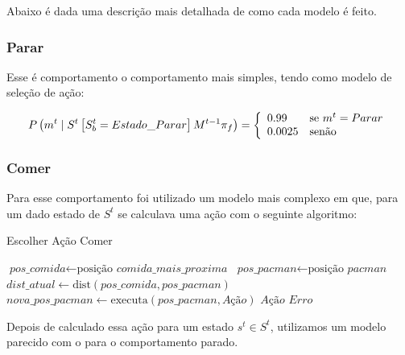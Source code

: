 Abaixo é dada uma descrição mais detalhada de como cada modelo é feito.

\subsubsection*{Parar}

Esse é comportamento o comportamento mais simples, tendo como modelo de seleção de ação:

\begin{equation}
    P \left( m^t \mid S^t \left[ S_b^t = Estado\_Parar \right] M^{t-1} \pi_f \right) = 
        \left\{
            \begin{array}{l l}
                0.99 & \text{se }m^t = Parar \\
                0.0025 & \text{senão}
            \end{array}
        \right.
\end{equation}

\subsubsection*{Comer}

Para esse comportamento foi utilizado um modelo mais complexo em que, para um dado estado de $ S^t $ se calculava uma ação com o seguinte algoritmo:

\begin{algorithm}[H]
	\caption{Escolher Ação Comer} \label{algorithm:SelecaoDeAcaoComer}
	\begin{algorithmic}[1]
			\State $\textit{pos\_comida} \gets \text{posição }\textit{comida\_mais\_proxima} $
			\State $\textit{pos\_pacman} \gets \text{posição }\textit{pacman} $
			\State $\textit{dist\_atual} \gets \text{dist} \left( \textit{pos\_comida}, \textit{pos\_pacman} \right) $
				\State $\textit{nova\_pos\_pacman} \gets \text{executa} \left( \textit{pos\_pacman}, \textit{Ação} \right) $
					\State \Return $ \textit{Ação} $
				\EndIf 
			\EndFor
			\State \Return $ \textit{Erro} $
		\EndProcedure
	\end{algorithmic}
\end{algorithm}

Depois de calculado essa ação para um estado $ s^t \in S^t $, utilizamos um modelo parecido com o para o comportamento parado.

